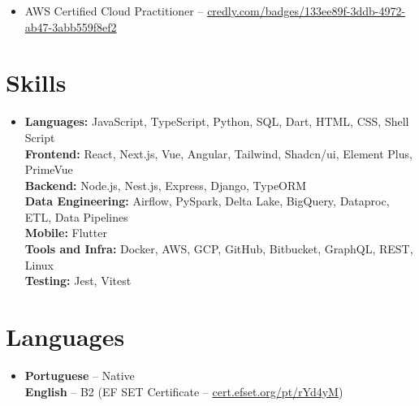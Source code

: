 \documentclass[letterpaper,11pt]{article}
\newcommand{\resumeSubHeadingListStart}{\begin{itemize}[leftmargin=0.15in, label={}]}
\newcommand{\resumeSubHeadingListEnd}{\end{itemize}}
\begin{document}
\resumeSubHeadingListStart
  \item
    \small{AWS Certified Cloud Practitioner -- \href{https://www.credly.com/badges/133ee89f-3ddb-4972-ab47-3abb559f8ef2/}{credly.com/badges/133ee89f-3ddb-4972-ab47-3abb559f8ef2}}
\resumeSubHeadingListEnd

\section{Skills}

\resumeSubHeadingListStart
  \item
    \small{
      \textbf{Languages:} JavaScript, TypeScript, Python, SQL, Dart, HTML, CSS, Shell Script \\
      \textbf{Frontend:} React, Next.js, Vue, Angular, Tailwind, Shadcn/ui, Element Plus, PrimeVue \\
      \textbf{Backend:} Node.js, Nest.js, Express, Django, TypeORM \\
      \textbf{Data Engineering:} Airflow, PySpark, Delta Lake, BigQuery, Dataproc, ETL, Data Pipelines \\
      \textbf{Mobile:} Flutter \\
      \textbf{Tools and Infra:} Docker, AWS, GCP, GitHub, Bitbucket, GraphQL, REST, Linux \\
      \textbf{Testing:} Jest, Vitest
    }
\resumeSubHeadingListEnd

\section{Languages}

\resumeSubHeadingListStart
  \item
    \small{
      \textbf{Portuguese} -- Native \\
      \textbf{English} -- B2 (EF SET Certificate -- \href{https://cert.efset.org/pt/rYd4yM}{cert.efset.org/pt/rYd4yM})
    }
\resumeSubHeadingListEnd

\end{document}
